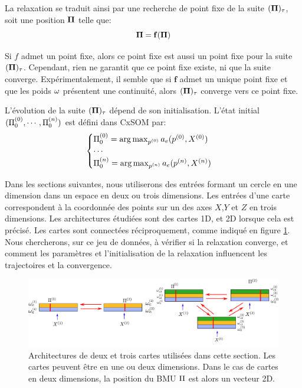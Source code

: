 \documentclass[../main]{subfiles}
\begin{document}
La relaxation se traduit ainsi par une recherche de point fixe de la suite $(\mathbf{\Pi})_{\tau}$, soit une position $\mathbf{\Pi}$ telle que:
\begin{equation}
\mathbf{\Pi} = \mathbf{f}(\mathbf{\Pi})
\label{eq:suite}
\end{equation}

Si $f$ admet un point fixe, alors ce point fixe est aussi un point fixe pour la suite $(\mathbf{\Pi})_\tau$. Cependant, rien ne garantit que ce point fixe existe, ni que la suite converge.
Expérimentalement, il semble que si $\mathbf{f}$ admet un unique point fixe et que les poids $\omega$ présentent une continuité, alors $(\mathbf{\Pi})_{\tau}$ converge vers ce point fixe. 

L'évolution de la suite $(\mathbf{\Pi})_{\tau}$ dépend de son initialisation.
L'état initial $(\Pi^{({0})}_0, \cdots , \Pi^{({n})}_0)$ est défini dans CxSOM par: 
\begin{equation}
\begin{cases}
\Pi^{({0})}_0 = \operatorname*{arg\,max}_{p^{({0})}} a_e(p^{({0})},X^{({0})})\\
\cdots \\
\Pi^{({n})}_0 = \operatorname*{arg\,max}_{p^{({n})}} a_e(p^{({n})},X^{({n})})\\
\end{cases}
\label{eq:init}
\end{equation}


Dans les sections suivantes, nous utiliserons des entrées formant un cercle en une dimension dans un espace en deux ou trois dimensions. Les entrées d'une carte correspondent à la coordonnée des points sur un des axes $X$,$Y$ et $Z$ en trois dimensions.
Les architectures étudiées sont des cartes 1D, et 2D lorsque cela est précisé. Les cartes sont connectées réciproquement, comme indiqué en figure \ref{fig:archis}.
Nous chercherons, sur ce jeu de données, à vérifier si la relaxation converge, et comment les paramètres et l'initialisation de la relaxation influencent les trajectoires et la convergence.
\begin{figure}
\centering
\includegraphics[width=\textwidth]{archis}
\caption{Architectures de deux et trois cartes utilisées dans cette section. Les cartes peuvent être en une ou deux dimensions. Dans le cas de cartes en deux dimensions, la position du BMU $\Pi$ est alors un vecteur 2D.}
\label{fig:archis}
\end{figure}
\end{document}
